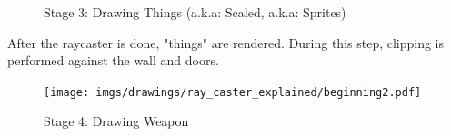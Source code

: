 \begin{figure}[H]
 \centering
 \caption{Stage 3: Drawing Things (a.k.a: Scaled, a.k.a: Sprites)}  
\end{figure}
 \begin{minipage}{.4\textwidth}
After the raycaster is done, "things" are rendered. During this step, clipping is performed against the wall and doors.
 \end{minipage}
\begin{minipage}{.6\textwidth}
\begin{figure}[H]
  \centering
 \texttt{[image: imgs/drawings/ray\_caster\_explained/beginning2.pdf]}
   
\end{figure}
\end{minipage}

 
 




 \begin{figure}[H]
\centering
 \caption{Stage 4: Drawing Weapon} 
 \end{figure}
 













